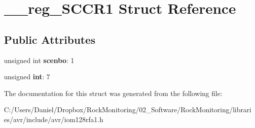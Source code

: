 \hypertarget{struct____reg___s_c_c_r1}{}\section{\+\_\+\+\_\+reg\+\_\+\+S\+C\+C\+R1 Struct Reference}
\label{struct____reg___s_c_c_r1}
\subsection*{Public Attributes}
\begin{DoxyCompactItemize}
\item 
unsigned int {\bfseries scenbo}\+: 1\hypertarget{struct____reg___s_c_c_r1_af2d5e5c5830c9c0da0e097c49a5a52c2}{}\label{struct____reg___s_c_c_r1_af2d5e5c5830c9c0da0e097c49a5a52c2}

\item 
unsigned {\bfseries int}\+: 7\hypertarget{struct____reg___s_c_c_r1_a4714ede226a01e50cb277ae777488b89}{}\label{struct____reg___s_c_c_r1_a4714ede226a01e50cb277ae777488b89}

\end{DoxyCompactItemize}


The documentation for this struct was generated from the following file\+:\begin{DoxyCompactItemize}
\item 
C\+:/\+Users/\+Daniel/\+Dropbox/\+Rock\+Monitoring/02\+\_\+\+Software/\+Rock\+Monitoring/libraries/avr/include/avr/iom128rfa1.\+h\end{DoxyCompactItemize}
